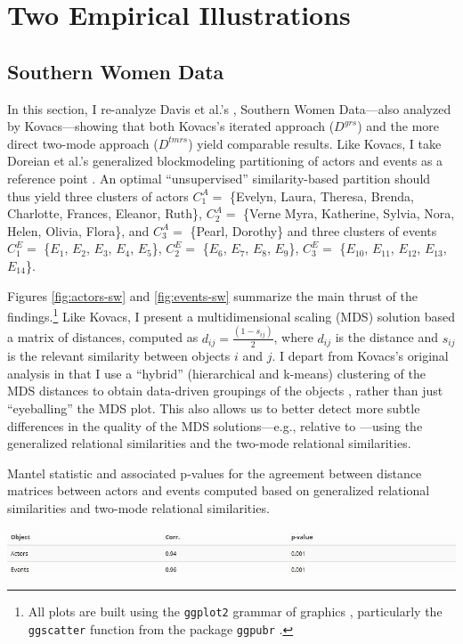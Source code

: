 \documentclass[a4paper,fleqn]{cas-sc}
\begin{document}
\section{Two Empirical Illustrations}
\subsection{Southern Women Data}
In this section, I re-analyze Davis et al.'s \citeyearpar{davis1941}, Southern Women Data---also analyzed by Kovacs---showing that both Kovacs's iterated approach ($D^{grs}$) and the more direct two-mode approach ($D^{tmrs}$) yield comparable results. Like Kovacs, I take Doreian et al.'s generalized blockmodeling partitioning of actors and events as a reference point \citeyearpar[Table 4]{doreian2004}. An optimal ``unsupervised'' similarity-based partition should thus yield three clusters of actors $C_1^A =$ \{Evelyn, Laura, Theresa, Brenda, Charlotte, Frances, Eleanor, Ruth\}, $C_2^A=$ \{Verne Myra, Katherine, Sylvia, Nora, Helen, Olivia, Flora\}, and $C_3^A=$ \{Pearl, Dorothy\} and three clusters of events $C_1^E=$ \{$E_1$, $E_2$, $E_3$, $E_4$, $E_5$\}, $C_2^E=$ \{$E_6$, $E_7$, $E_8$, $E_9$\}, $C_3^E=$ \{$E_{10}$, $E_{11}$, $E_{12}$, $E_{13}$, $E_{14}$\}. 

Figures \ref{fig:actors-sw} and \ref{fig:events-sw} summarize the main thrust of the findings.\footnote{All plots are built using the \texttt{ggplot2} grammar of graphics \citep{wickham16}, particularly the \texttt{ggscatter} function from the package \texttt{ggpubr} \citep{kassambara}.} Like Kovacs, I present a multidimensional scaling (MDS) solution based a matrix of distances, computed as $d_{ij} = \frac{(1-s_{ij})}{2}$, where $d_{ij}$ is the distance and $s_{ij}$ is the relevant similarity between objects $i$ and $j$. I depart from Kovacs's original analysis in that I use a ``hybrid'' (hierarchical and k-means) clustering of the MDS distances to obtain data-driven groupings of the objects \citep{chen2005novel}, rather than just ``eyeballing'' the MDS plot. This also allows us to better detect more subtle differences in the quality of the MDS solutions---e.g., relative to \citet{doreian2004}---using the generalized relational similarities and the two-mode relational similarities. 

\begin{table}[ht!]
    \caption{Mantel statistic and associated p-values for the agreement between distance matrices between actors and events computed based on generalized relational similarities and two-mode relational similarities.}
    \centering
    \includegraphics[width=1.0\textwidth]{Tabs/corr-tab.jpg}
    \label{tab:mantel}
\end{table}
  
\end{document}
